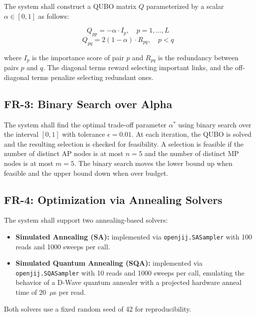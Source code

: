 \documentclass[12pt,a4paper]{article}
\begin{document}
The system shall construct a QUBO matrix $Q$ parameterized by a scalar
$\alpha \in [0, 1]$ as follows:

\begin{equation}
    Q_{pp} = -\alpha \cdot I_p, \quad p = 1, \ldots, L
\end{equation}
\begin{equation}
    Q_{pq} = 2(1 - \alpha) \cdot R_{pq}, \quad p < q
\end{equation}

where $I_p$ is the importance score of pair $p$ and $R_{pq}$ is the
redundancy between pairs $p$ and $q$. The diagonal terms reward selecting
important links, and the off-diagonal terms penalize selecting redundant ones.

\subsection{FR-3: Binary Search over Alpha}

The system shall find the optimal trade-off parameter $\alpha^{*}$ using
binary search over the interval $[0, 1]$ with tolerance $\epsilon = 0.01$.
At each iteration, the QUBO is solved and the resulting selection is checked
for feasibility. A selection is feasible if the number of distinct AP nodes
is at most $n = 5$ and the number of distinct MP nodes is at most $m = 5$.
The binary search moves the lower bound up when feasible and the upper bound
down when over budget.

\subsection{FR-4: Optimization via Annealing Solvers}

The system shall support two annealing-based solvers:

\begin{itemize}[leftmargin=2em]
    \item \textbf{Simulated Annealing (SA):} implemented via
          \texttt{openjij.SASampler} with 100 reads and 1000 sweeps per call.
    \item \textbf{Simulated Quantum Annealing (SQA):} implemented via
          \texttt{openjij.SQASampler} with 10 reads and 1000 sweeps per call,
          emulating the behavior of a D-Wave quantum annealer with a projected
          hardware anneal time of 20~$\mu$s per read.
\end{itemize}

Both solvers use a fixed random seed of 42 for reproducibility.
\end{document}
